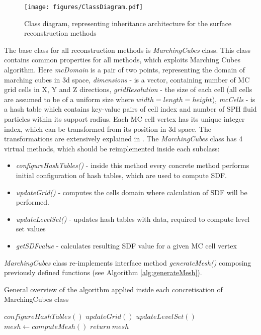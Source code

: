 \begin{figure}[H]

	\begin{center}
		\texttt{[image: figures/ClassDiagram.pdf]}
	\end{center}
	\caption{Class diagram, representing inheritance architecture for the surface reconstruction methods}
    \label{fig:class-diagam}
\end{figure}
The base class for all reconstruction methods is \emph{MarchingCubes} class. This class contains common properties for all methods, which exploits Marching Cubes algorithm. Here \emph{mcDomain} is a pair of two points, representing the domain of marching cubes in 3d space, \emph{dimensions} - is a vector, containing number of MC grid cells in X, Y and Z directions, \emph{gridResolution} - the size of each cell (all cells are assumed to be of a uniform size where $width=length=height$), \emph{mcCells} - is a hash table which contains key-value pairs of cell index and number of SPH fluid particles within its support radius. Each MC cell vertex has its unique integer index, which can be transformed from its position in 3d space. The transformations are extensively explained in \cite{Akinchi}. 
The \emph{MarchingCubes} class has 4 virtual methods, which should be reimplemented inside each subclass:
\begin{itemize}
	\item \emph{configureHashTables()} - inside this method every concrete method performs initial configuration of hash tables, which are used to compute SDF.
	\item \emph{updateGrid()} - computes the cells domain where calculation of SDF will be performed.
	\item \emph{updateLevelSet()} - updates hash tables with data, required to compute level set values
	\item \emph{getSDFvalue} - calculates resulting SDF value for a given MC cell vertex
\end{itemize}

\emph{MarchingCubes} class re-implements interface method \emph{generateMesh()} composing previously defined functions (see Algorithm \ref{alg:generateMesh}).

\begin{algorithm}
	\scriptsize
	\caption{General overview of the algorithm applied inside each concretisation of MarchingCubes class}
	\label{alg:generateMesh}
	\begin{algorithmic}
		\State $configureHashTables()$
		\State $updateGrid()$
		\State $updateLevelSet()$
		\State $mesh \gets computeMesh()$ 
		\State $return\ mesh$
	\end{algorithmic}
\end{algorithm}

